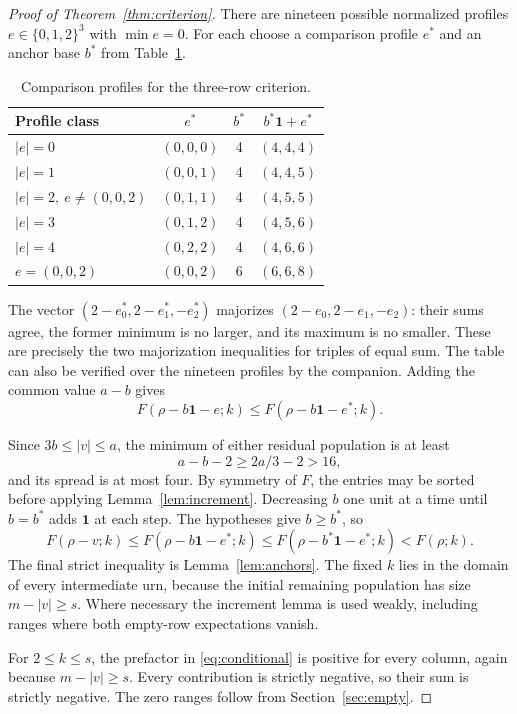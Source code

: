 \documentclass[11pt,a4paper]{article}
\theoremstyle{remark}
\newcommand{\one}{\mathbf 1}
\numberwithin{equation}{section}
\begin{document}
\begin{proof}[Proof of Theorem~\ref{thm:criterion}]
There are nineteen possible normalized profiles
\(e\in\{0,1,2\}^3\) with \(\min e=0\).
For each choose a comparison profile \(e^*\) and an anchor base
\(b^*\) from Table~\ref{tab:major}.

\begin{table}[htbp]
\centering
\begin{tabular}{@{}lccc@{}}
\toprule
Profile class&\(e^*\)&\(b^*\)&\(b^*\one+e^*\)\\
\midrule
\(|e|=0\)&\((0,0,0)\)&4&\((4,4,4)\)\\
\(|e|=1\)&\((0,0,1)\)&4&\((4,4,5)\)\\
\(|e|=2,\ e\ne(0,0,2)\)&\((0,1,1)\)&4&\((4,5,5)\)\\
\(|e|=3\)&\((0,1,2)\)&4&\((4,5,6)\)\\
\(|e|=4\)&\((0,2,2)\)&4&\((4,6,6)\)\\
\(e=(0,0,2)\)&\((0,0,2)\)&6&\((6,6,8)\)\\
\bottomrule
\end{tabular}
\caption{Comparison profiles for the three-row criterion.}\label{tab:major}
\end{table}

The vector \((2-e^*_0,2-e^*_1,-e^*_2)\) majorizes
\((2-e_0,2-e_1,-e_2)\): their sums agree, the former minimum is
no larger, and its maximum is no smaller. These are precisely the
two majorization inequalities for triples of equal sum.
The table can also be verified over the nineteen profiles by the
companion. Adding the common value \(a-b\) gives
\[
 F(\rho-b\one-e;k)\le F(\rho-b\one-e^*;k).
\]

Since \(3b\le |v|\le a\), the minimum of either residual population
is at least
\[
 a-b-2\ge 2a/3-2>16,
\]
and its spread is at most four. By symmetry of \(F\), the entries
may be sorted before applying Lemma~\ref{lem:increment}.
Decreasing \(b\) one unit at a time until \(b=b^*\) adds \(\one\)
at each step. The hypotheses give \(b\ge b^*\), so
\[
 F(\rho-v;k)
 \le F(\rho-b\one-e^*;k)
 \le F(\rho-b^*\one-e^*;k)
 < F(\rho;k).
\]
The final strict inequality is Lemma~\ref{lem:anchors}.
The fixed \(k\) lies in the domain of every intermediate urn,
because the initial remaining population has size \(m-|v|\ge s\).
Where necessary the increment lemma is used weakly, including ranges
where both empty-row expectations vanish.

For \(2\le k\le s\), the prefactor in \eqref{eq:conditional} is
positive for every column, again because \(m-|v|\ge s\).
Every contribution is strictly negative, so their sum is strictly
negative. The zero ranges follow from Section~\ref{sec:empty}.
\end{proof}
\end{document}
